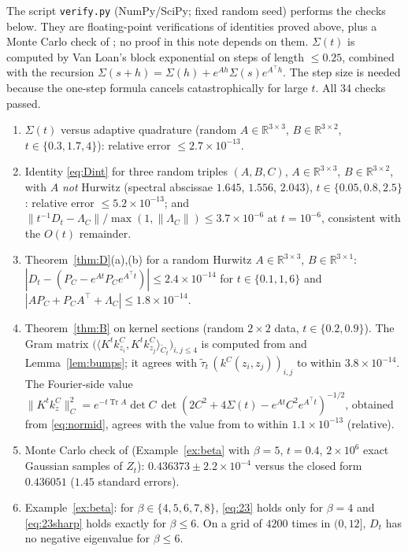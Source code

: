 \documentclass[11pt]{article}
\theoremstyle{definition}
\theoremstyle{remark}
\newcommand{\R}{\mathbb{R}}
\newcommand{\Tr}{\operatorname{Tr}}
\newcommand{\Ct}{\widetilde{C}_t}
\newcommand{\taut}{\widetilde{\tau}_t}
\newcommand{\ip}[2]{\langle #1,#2\rangle}
\newcommand{\tp}{\top}
\begin{document}
The script \texttt{verify.py} (NumPy/SciPy; fixed random seed) performs the checks below. They are floating-point
verifications of identities proved above, plus a Monte Carlo check of \cite[Proposition~4.1]{PSWPN}; no proof in this
note depends on them. $\Sigma(t)$ is computed by Van Loan's block exponential \cite{VanLoan} on steps of length
$\le0.25$, combined with the recursion $\Sigma(s+h)=\Sigma(h)+e^{Ah}\Sigma(s)e^{A^\tp h}$. The step size is needed
because the one-step formula cancels catastrophically for large $t$. All 34 checks passed.
\begin{enumerate}
\item $\Sigma(t)$ versus adaptive quadrature (random $A\in\R^{3\times3}$, $B\in\R^{3\times2}$, $t\in\{0.3,1.7,4\}$):
relative error $\le2.7\times10^{-13}$.
\item Identity \eqref{eq:Dint} for three random triples $(A,B,C)$, $A\in\R^{3\times3}$, $B\in\R^{3\times2}$, with $A$
\emph{not} Hurwitz (spectral abscissae $1.645$, $1.556$, $2.043$), $t\in\{0.05,0.8,2.5\}$:
relative error $\le5.2\times10^{-13}$; and $\|t^{-1}D_t-\Lambda_C\|/\max(1,\|\Lambda_C\|)\le3.7\times10^{-6}$ at $t=10^{-6}$,
consistent with the $O(t)$ remainder.
\item Theorem~\ref{thm:D}(a),(b) for a random Hurwitz $A\in\R^{3\times3}$, $B\in\R^{3\times1}$: $|D_t-(P_C-e^{At}P_Ce^{A^\tp t})|\le2.4\times10^{-14}$ for
$t\in\{0.1,1,6\}$ and $|AP_C+P_CA^\tp+\Lambda_C|\le1.8\times10^{-14}$.
\item Theorem~\ref{thm:B} on kernel sections (random $2\times2$ data, $t\in\{0.2,0.9\}$). The Gram matrix
$\bigl(\ip{K^tk^C_{z_i}}{K^tk^C_{z_j}}_{\Ct}\bigr)_{i,j\le4}$ is computed from \cite[Proposition~4.1]{PSWPN} and
Lemma~\ref{lem:bumps}; it agrees with $\taut\,(k^C(z_i,z_j))_{i,j}$ to within $3.8\times10^{-14}$. The Fourier-side value
$\|K^tk^C_z\|_C^2=e^{-t\Tr A}\det C\,\det(2C^2+4\Sigma(t)-e^{At}C^2e^{A^\tp t})^{-1/2}$, obtained from \eqref{eq:normid},
agrees with the value from \cite[Proposition~4.1]{PSWPN} to within $1.1\times10^{-13}$ (relative).
\item Monte Carlo check of \cite[Proposition~4.1]{PSWPN} (Example~\ref{ex:beta} with $\beta=5$, $t=0.4$, $2\times10^6$
exact Gaussian samples of $Z_t$): $0.436373\pm2.2\times10^{-4}$ versus the closed form $0.436051$ ($1.45$ standard
errors).
\item Example~\ref{ex:beta}: for $\beta\in\{4,5,6,7,8\}$, \eqref{eq:23} holds only for $\beta=4$ and \eqref{eq:23sharp}
holds exactly for $\beta\le6$. On a grid of $4200$ times in $(0,12]$, $D_t$ has no negative eigenvalue for $\beta\le6$.

\end{enumerate}
\end{document}
